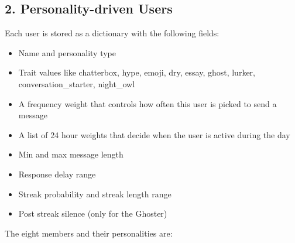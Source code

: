 \documentclass{article}
\begin{document}
\subsection*{2. Personality-driven Users}

Each user is stored as a dictionary with the following fields:

\begin{itemize}
    \item Name and personality type
    \item Trait values like chatterbox, hype, emoji, dry, essay, ghost, lurker, conversation\_starter, night\_owl
    \item A frequency weight that controls how often this user is picked to send a message
    \item A list of 24 hour weights that decide when the user is active during the day
    \item Min and max message length
    \item Response delay range
    \item Streak probability and streak length range
    \item Post streak silence (only for the Ghoster)
\end{itemize}

The eight members and their personalities are:
\end{document}
